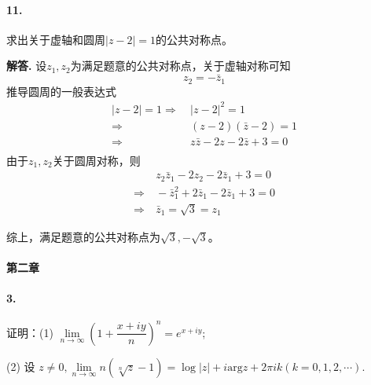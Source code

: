\documentclass[12pt, a4paper, oneside]{ctexart}
\newenvironment{solution}{\par\noindent\textbf{解答. }}{\bigskip\par}
\begin{document}
\paragraph{11.}求出关于虚轴和圆周$|z-2|=1$的公共对称点。
\begin{solution}
    设$z_1,z_2$为满足题意的公共对称点，关于虚轴对称可知\begin{equation*}
        z_2=-\bar{z}_1
    \end{equation*}
    推导圆周的一般表达式
    \begin{equation*}
        \begin{aligned}
            |z-2|=1\Rightarrow&\ |z-2|^2=1\\
            \Rightarrow&\ (z-2)(\bar{z}-2) = 1\\
            \Rightarrow&\ z\bar{z} - 2z - 2\bar{z} + 3 = 0\\
        \end{aligned}
    \end{equation*}
    由于$z_1,z_2$关于圆周对称，则\begin{equation*}
        \begin{aligned}
            &\ z_2\bar{z}_1-2z_2-2\bar{z}_1+3=0\\
            \Rightarrow&\ -\bar{z}_1^2 +2\bar{z}_1-2\bar{z}_1+3 = 0\\
            \Rightarrow&\ \bar{z}_1 = \sqrt{3} = z_1
        \end{aligned}
    \end{equation*}

    综上，满足题意的公共对称点为$\sqrt{3},-\sqrt{3}$。
\end{solution}
\paragraph{第二章}
\paragraph{3.}证明：(1) $\lim\limits_{n\rightarrow\infty}\left(1+\dfrac{x+iy}{n}\right)^n = e^{x+iy}$;

(2) 设 $z\neq 0,\lim\limits_{n\rightarrow\infty}n(\sqrt[n]{z}-1)=\log|z|+i\text{arg}z+2\pi ik(k=0,1,2,\cdots)$.
\end{document}
